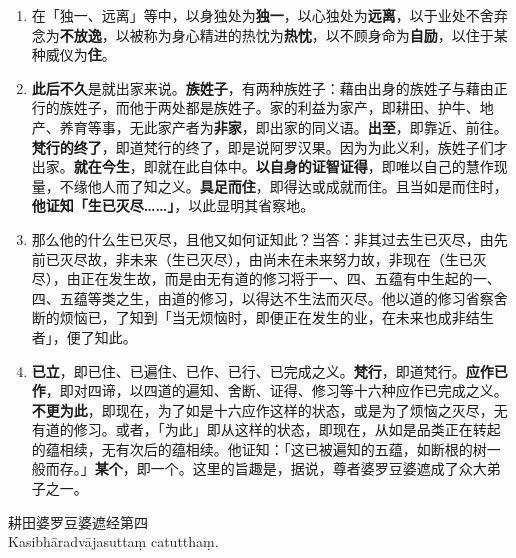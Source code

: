 \begin{enumerate}\item 在「独一、远离」等中，以身独处为\textbf{独一}，以心独处为\textbf{远离}，以于业处不舍弃念为\textbf{不放逸}，以被称为身心精进的热忱为\textbf{热忱}，以不顾身命为\textbf{自励}，以住于某种威仪为\textbf{住}。
\item \textbf{此后不久}是就出家来说。\textbf{族姓子}，有两种族姓子：藉由出身的族姓子与藉由正行的族姓子，而他于两处都是族姓子。家的利益为家产，即耕田、护牛、地产、养育等事，无此家产者为\textbf{非家}，即出家的同义语。\textbf{出至}，即靠近、前往。\textbf{梵行的终了}，即道梵行的终了，即是说阿罗汉果。因为为此义利，族姓子们才出家。\textbf{就在今生}，即就在此自体中。\textbf{以自身的证智证得}，即唯以自己的慧作现量，不缘他人而了知之义。\textbf{具足而住}，即得达或成就而住。且当如是而住时，\textbf{他证知「生已灭尽……」}，以此显明其省察地。
\item 那么他的什么生已灭尽，且他又如何证知此？当答：非其过去生已灭尽，由先前已灭尽故，非未来（生已灭尽），由尚未在未来努力故，非现在（生已灭尽），由正在发生故，而是由无有道的修习将于一、四、五蕴有中生起的一、四、五蕴等类之生，由道的修习，以得达不生法而灭尽。他以道的修习省察舍断的烦恼已，了知到「当无烦恼时，即便正在发生的业，在未来也成非结生者」，便了知此。
\item \textbf{已立}，即已住、已遍住、已作、已行、已完成之义。\textbf{梵行}，即道梵行。\textbf{应作已作}，即对四谛，以四道的遍知、舍断、证得、修习等十六种应作已完成之义。\textbf{不更为此}，即现在，为了如是十六应作这样的状态，或是为了烦恼之灭尽，无有道的修习。或者，「为此」即从这样的状态，即现在，从如是品类正在转起的蕴相续，无有次后的蕴相续。他证知：「这已被遍知的五蕴，如断根的树一般而存。」\textbf{某个}，即一个。这里的旨趣是，据说，尊者婆罗豆婆遮成了众大弟子之一。\end{enumerate}

\begin{center}\vspace{1em}耕田婆罗豆婆遮经第四\\Kasibhāradvājasuttaṃ catutthaṃ.\end{center}

